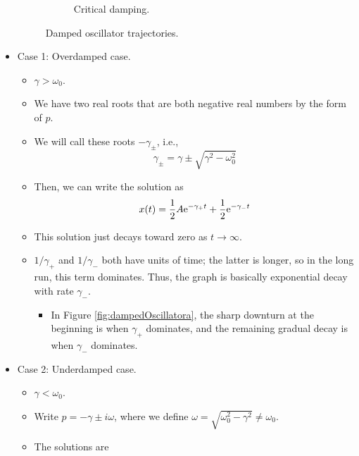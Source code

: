 \documentclass[../notes.tex]{subfiles}
\begin{document}
\begin{itemize}
\begin{figure}[h!]
\begin{subfigure}[b]{0.3\linewidth}
            \caption{Critical damping.}
            \label{fig:dampedOscillatorc}
        \end{subfigure}
        \caption{Damped oscillator trajectories.}
        \label{fig:dampedOscillator}
    \end{figure}
    \item Case 1: Overdamped case.
    \begin{itemize}
        \item $\gamma>\omega_0$.
        \item We have two real roots that are both negative real numbers by the form of $p$.
        \item We will call these roots $-\gamma_\pm$, i.e.,
        \begin{equation*}
            \gamma_\pm = \gamma\pm\sqrt{\gamma^2-\omega_0^2}
        \end{equation*}
        \item Then, we can write the solution as
        \begin{equation*}
            x(t) = \frac{1}{2}A\e[-\gamma_+t]+\frac{1}{2}\e[-\gamma_-t]
        \end{equation*}
        \item This solution just decays toward zero as $t\to\infty$.
        \item $1/\gamma_+$ and $1/\gamma_-$ both have units of time; the latter is longer, so in the long run, this term dominates. Thus, the graph is basically exponential decay with rate $\gamma_-$.
        \begin{itemize}
            \item In Figure \ref{fig:dampedOscillatora}, the sharp downturn at the beginning is when $\gamma_+$ dominates, and the remaining gradual decay is when $\gamma_-$ dominates.
        \end{itemize}
    \end{itemize}
    \item Case 2: Underdamped case.
    \begin{itemize}
        \item $\gamma<\omega_0$.
        \item Write $p=-\gamma\pm i\omega$, where we define $\omega=\sqrt{\omega_0^2-\gamma^2}\neq\omega_0$.
        \item The solutions are
        \begin{align*}

\end{align*}
\end{itemize}
\end{itemize}
\end{document}

